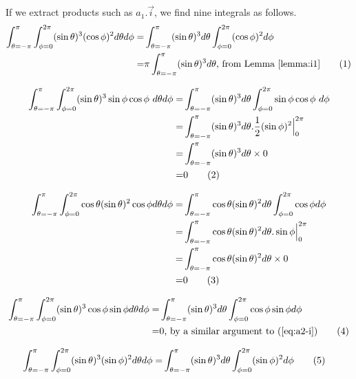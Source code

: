 \documentclass[]{article}
\newcommand\numberthis{\addtocounter{equation}{1}\tag{\theequation}}
\begin{document}
If we extract products such as $a_1.\vec{i}$, we find nine integrals as follows.
\begin{align*}
\int_{\theta=-\pi}^{\pi}\int_{\phi=0}^{2\pi}(\sin\theta)^3(\cos\phi)^2 d\theta d\phi=&\int_{\theta=-\pi}^{\pi}(\sin\theta)^3d\theta\int_{\phi=0}^{2\pi}(\cos\phi)^2  d\phi\\
=&\pi \int_{\theta=-\pi}^{\pi}(\sin\theta)^3d\theta\text{, from Lemma \ref{lemma:i1}} \numberthis \label{eq:a1-i}
\end{align*}

\begin{align*}
\int_{\theta=-\pi}^{\pi}\int_{\phi=0}^{2\pi}(\sin\theta)^3\sin\phi\cos\phi\ d\theta d\phi=&\int_{\theta=-\pi}^{\pi}(\sin\theta)^3d\theta\int_{\phi=0}^{2\pi}\sin\phi\cos\phi\  d\phi\\
=&\int_{\theta=-\pi}^{\pi}(\sin\theta)^3d\theta . \frac{1}{2} (\sin \phi)^2 \Big|_0^{2\pi} \\
=&\int_{\theta=-\pi}^{\pi}(\sin\theta)^3d\theta\times 0\\
=&0 \numberthis \label{eq:a2-i}
\end{align*}

\begin{align*}
\int_{\theta=-\pi}^{\pi}\int_{\phi=0}^{2\pi}\cos\theta(\sin\theta)^2\cos\phi d\theta d\phi=&\int_{\theta=-\pi}^{\pi}\cos\theta(\sin\theta)^2d\theta\int_{\phi=0}^{2\pi}\cos\phi  d\phi\\
=&\int_{\theta=-\pi}^{\pi}\cos\theta(\sin\theta)^2d\theta . \sin\phi \Big|_0^{2\pi}\\
=&\int_{\theta=-\pi}^{\pi}\cos\theta(\sin\theta)^2d\theta \times 0\\
=&0 \numberthis \label{eq:a3-i}
\end{align*}

\begin{align*}
\int_{\theta=-\pi}^{\pi}\int_{\phi=0}^{2\pi}(\sin\theta)^3\cos\phi\sin\phi d\theta d\phi=&\int_{\theta=-\pi}^{\pi}(\sin\theta)^3d\theta\int_{\phi=0}^{2\pi}\cos\phi\sin\phi  d\phi\\
=&0 \text{, by a similar argument to (\ref{eq:a2-i})}\numberthis \label{eq:a1-j}
\end{align*}

\begin{align*}
\int_{\theta=-\pi}^{\pi}\int_{\phi=0}^{2\pi}(\sin\theta)^3(\sin\phi)^2 d\theta d\phi=&\int_{\theta=-\pi}^{\pi}(\sin\theta)^3 d\theta \int_{\phi=0}^{2\pi}(\sin\phi)^2  d\phi \numberthis \label{eq:a2-j}
\end{align*}
\end{document}
